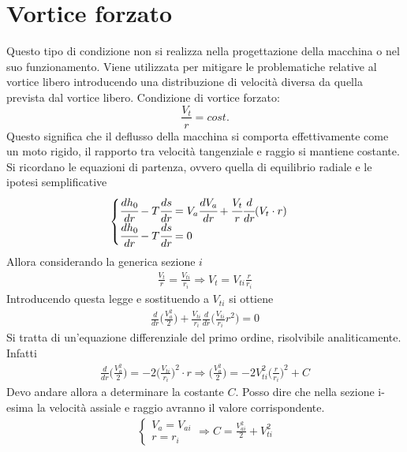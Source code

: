 \section{Vortice forzato}
Questo tipo di condizione non si realizza nella progettazione della macchina o nel suo funzionamento. Viene utilizzata per mitigare le problematiche relative al vortice libero introducendo una distribuzione di velocità diversa da quella prevista dal vortice libero. Condizione di vortice forzato:
\begin{equation}
\boxed{\frac{V_t}{r} = cost.}
\label{eq:VortForz}
\end{equation}
Questo significa che il deflusso della macchina si comporta effettivamente come un moto rigido, il rapporto tra velocità tangenziale e raggio si mantiene costante.
Si ricordano le equazioni di partenza, ovvero quella di equilibrio radiale e le ipotesi semplificative
\begin{align*}
\begin{cases}
\cfrac{dh_0}{dr} - T\cfrac{ds}{dr} = V_a \cfrac{dV_a}{dr} + \cfrac{V_t}{r} \cfrac{d}{dr}(V_t \cdot r)\\
\cfrac{dh_0}{dr} - T\cfrac{ds}{dr} = 0
\end{cases}
\end{align*}
Allora considerando la generica sezione $i$
\begin{align*}
\frac{V_t}{r} = \frac{V_{ti}}{r_i} \Rightarrow V_t = V_{ti} \frac{r}{r_i}
\end{align*}
Introducendo questa legge e sostituendo a $V_{ti}$ si ottiene
\begin{align*}
\boxed{\frac{d}{dr}\bigg( \frac{V_a^2}{2} \bigg) + \frac{V_{ti}}{r_i} \frac{d}{dr} \bigg(\frac{V_{ti}}{r_i} r^2 \bigg) = 0}
\end{align*}
Si tratta di un'equazione differenziale del primo ordine, risolvibile analiticamente. Infatti
\begin{align*}
\frac{d}{dr} \bigg( \frac{V_a^2}{2} \bigg) = -2 \bigg( \frac{V_{ti}}{r_i} \bigg) ^2 \cdot r
\Rightarrow
\bigg( \frac{V_a^2}{2} \bigg) = -2 V_{ti}^2 \bigg(\frac{r}{r_i} \bigg)^2 +C
\label{eq:SolCost}
\end{align*}
Devo andare allora a determinare la costante $C$. Posso dire che nella sezione i-esima la velocità assiale e raggio avranno il valore corrispondente.
\begin{align*}
\begin{cases}
V_a=V_{ai}\\
r=r_i
\end{cases}
\Rightarrow
C = \frac{V_{ai}^2}{2} + V_{ti}^2
\end{align*}
